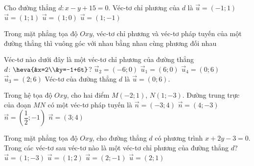 \begin{ex}%
	Cho đường thẳng $d\colon x-y+15=0$. Véc-tơ chỉ phương của $d$ là
	\choice
	{$\overrightarrow{u}=(-1;1)$}
	{\True $\overrightarrow{u}=(1;1)$}
	{$\overrightarrow{u}=(1;0)$}
	{$\overrightarrow{u}=(1;-1)$}
\end{ex}


\begin{ex}%
	Trong mặt phẳng tọa độ $Oxy$, véc-tơ chỉ phương và véc-tơ pháp tuyến của một đường thẳng thì
	\choice
	{\True vuông góc với nhau}
	{bằng nhau}
	{cùng phương}
	{đối nhau}
\end{ex}


\begin{ex}%
	Véc-tơ nào dưới đây là một véc-tơ chỉ phương của đường thẳng $d\colon\heva{&x=2\\&y=-1+6t}$?
	\choice
	{$\overrightarrow{u}_2=(-6;0)$}
	{$\overrightarrow{u}_1=(6;0)$}
	{\True $\overrightarrow{u}_4=(0;6)$}
	{$\overrightarrow{u}_3=(2;6)$}
	\loigiai
	{
		Véc-tơ của đường thẳng $d$ là $\overrightarrow{u}=(0;6)$.
	}
\end{ex}


\begin{ex}%
	Trong hệ tọa độ $Oxy$, cho hai điểm $M(-2;1)$, $N(1;-3)$. Đường trung trực của đoạn $MN$ có một véc-tơ pháp tuyến là
	\choice
	{\True $\overrightarrow{n}=(-3;4)$}
	{$\overrightarrow{n}=(4;-3)$}
	{$\overrightarrow{n}=\left(\dfrac{1}{2};-1\right)$}
	{$\overrightarrow{n}=(3;4)$}
\end{ex}


\begin{ex}%
	Trong mặt phẳng tọa độ $Oxy$, cho đường thẳng $d$ có phương trình $x+2y-3=0$. Trong các véc-tơ sau véc-tơ nào là một véc-tơ chỉ phương của đường thẳng $d$?
	\choice
	{$\overrightarrow{u}=(1;-3)$}
	{$\overrightarrow{u}=(1;2)$}
	{\True $\overrightarrow{u}=(2;-1)$}
	{$\overrightarrow{u}=(2;1)$}
\end{ex}


